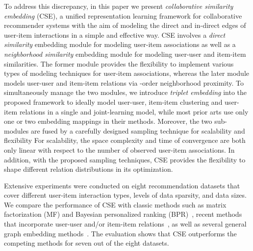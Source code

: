 \documentclass[sigconf,anonymous=false]{acmart}
\begin{document}
To address this discrepancy, in this paper we present \emph{collaborative
similarity embedding} (CSE), a unified representation learning framework for
collaborative recommender systems with the aim of modeling the direct and
in-direct edges of user-item interactions in a simple and effective way. 
CSE involves a \emph{direct similarity} embedding module for modeling
user-item associations as well as a \emph{neighborhood similarity} embedding
module for modeling user-user and item-item similarities.
The former module provides the flexibility to implement various types of modeling
techniques for user-item associations, whereas the later module models
user-user and item-item relations via -order neighborhood proximity.
To simultaneously manage the two modules, we introduce \emph{triplet embedding}
into the proposed framework to ideally model user-user, item-item clustering
and user-item relations in a single and joint-learning model, while most prior
arts use only one or two embedding mappings in their methods.
Moreover, the two sub-modules are fused by a carefully designed sampling
technique for scalability and flexibility
For scalability, the space complexity and time of convergence are both only
linear with respect to the number of observed user-item associations.
In addition, with the proposed sampling techniques, CSE provides the
flexibility to shape different relation distributions in its optimization.

Extensive experiments were conducted on eight recommendation datasets that
cover different user-item interaction types, levels of data sparsity, and data
sizes.
We compare the performance of CSE with classic methods such as matrix
factorization (MF) and Bayesian personalized ranking (BPR)~\cite{bpr}, recent
methods that incorporate user-user and/or item-item
relations~\cite{cml,cofactor,walkranker}, as well as several general graph
embedding methods~\cite{dw,bine}.
The evaluation shows that CSE outperforms the competing methods for seven out
of the eight datasets. 
\end{document}
